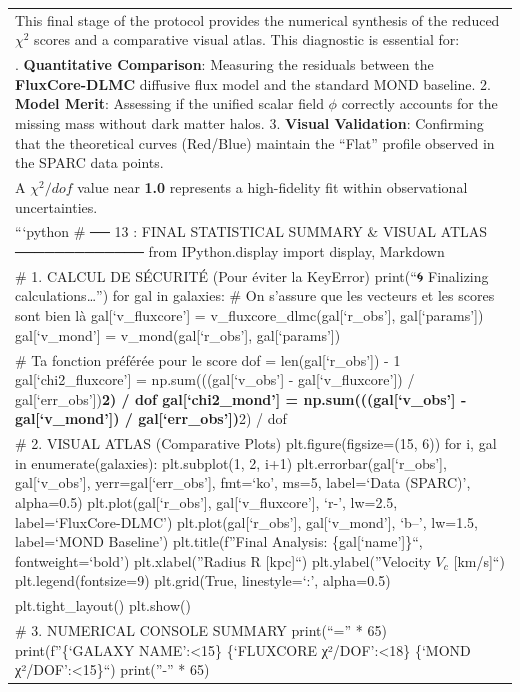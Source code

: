 \documentclass[
]{article}
\begin{document}
{\begin{longtable}[]{@{}
  >{\raggedright\arraybackslash}p{}@{}}
This final stage of the protocol provides the numerical synthesis of the
reduced \(\chi^2\) scores and a comparative visual atlas. This
diagnostic is essential for: \\
1. \textbf{Quantitative Comparison}: Measuring the residuals between the
\textbf{FluxCore-DLMC} diffusive flux model and the standard MOND
baseline. 2. \textbf{Model Merit}: Assessing if the unified scalar field
\(\phi\) correctly accounts for the missing mass without dark matter
halos. 3. \textbf{Visual Validation}: Confirming that the theoretical
curves (Red/Blue) maintain the ``Flat'' profile observed in the SPARC
data points. \\
A \(\chi^2/dof\) value near \textbf{1.0} represents a high-fidelity fit
within observational uncertainties. \\
```python \# ── 13 : FINAL STATISTICAL SUMMARY \& VISUAL ATLAS
───────────── from IPython.display import display, Markdown \\
\# 1. CALCUL DE SÉCURITÉ (Pour éviter la KeyError) print(``🌀 Finalizing
calculations\ldots{}'') for gal in galaxies: \# On s'assure que les
vecteurs et les scores sont bien là gal{[}`v\_fluxcore'{]} =
v\_fluxcore\_dlmc(gal{[}`r\_obs'{]}, gal{[}`params'{]})
gal{[}`v\_mond'{]} = v\_mond(gal{[}`r\_obs'{]}, gal{[}`params'{]}) \\
\# Ta fonction préférée pour le score dof = len(gal{[}`r\_obs'{]}) - 1
gal{[}`chi2\_fluxcore'{]} = np.sum(((gal{[}`v\_obs'{]} -
gal{[}`v\_fluxcore'{]}) / gal{[}`err\_obs'{]})\textbf{2) / dof
gal{[}`chi2\_mond'{]} = np.sum(((gal{[}`v\_obs'{]} - gal{[}`v\_mond'{]})
/ gal{[}`err\_obs'{]})}2) / dof \\
\# 2. VISUAL ATLAS (Comparative Plots) plt.figure(figsize=(15, 6)) for
i, gal in enumerate(galaxies): plt.subplot(1, 2, i+1)
plt.errorbar(gal{[}`r\_obs'{]}, gal{[}`v\_obs'{]},
yerr=gal{[}`err\_obs'{]}, fmt=`ko', ms=5, label=`Data (SPARC)',
alpha=0.5) plt.plot(gal{[}`r\_obs'{]}, gal{[}`v\_fluxcore'{]}, `r-',
lw=2.5, label=`FluxCore-DLMC') plt.plot(gal{[}`r\_obs'{]},
gal{[}`v\_mond'{]}, `b--', lw=1.5, label=`MOND Baseline')
plt.title(f''Final Analysis: \{gal{[}`name'{]}\}``, fontweight=`bold')
plt.xlabel(''Radius R {[}kpc{]}``) plt.ylabel(''Velocity \(V_c\)
{[}km/s{]}``) plt.legend(fontsize=9) plt.grid(True, linestyle=`:',
alpha=0.5) \\
plt.tight\_layout() plt.show() \\
\# 3. NUMERICAL CONSOLE SUMMARY print(``='' * 65) print(f''\{`GALAXY
NAME':\textless15\} \textbar{} \{`FLUXCORE χ²/DOF':\textless18\}
\textbar{} \{`MOND χ²/DOF':\textless15\}``) print(''-'' * 65) \\

\end{longtable}}
\end{document}
